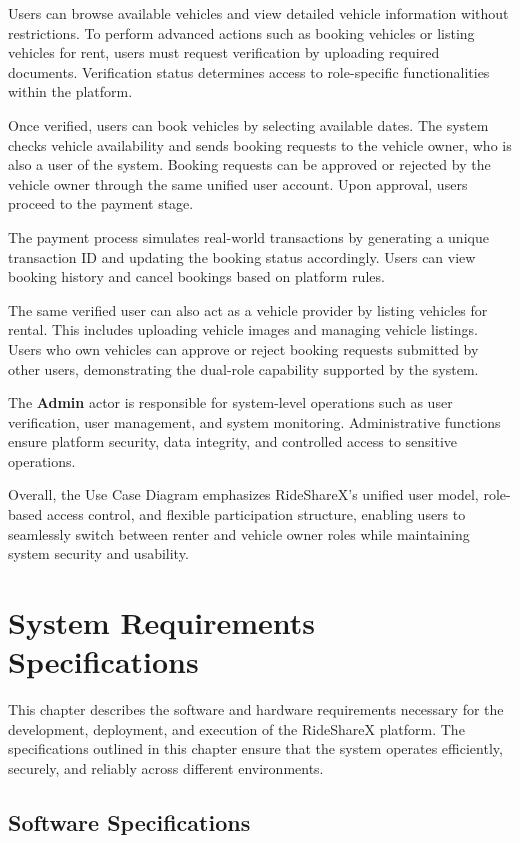 \documentclass[12pt,a4paper]{report}
\begin{document}
Users can browse available vehicles and view detailed vehicle information without restrictions. To perform advanced actions such as booking vehicles or listing vehicles for rent, users must request verification by uploading required documents. Verification status determines access to role-specific functionalities within the platform.

Once verified, users can book vehicles by selecting available dates. The system checks vehicle availability and sends booking requests to the vehicle owner, who is also a user of the system. Booking requests can be approved or rejected by the vehicle owner through the same unified user account. Upon approval, users proceed to the payment stage.

The payment process simulates real-world transactions by generating a unique transaction ID and updating the booking status accordingly. Users can view booking history and cancel bookings based on platform rules.

The same verified user can also act as a vehicle provider by listing vehicles for rental. This includes uploading vehicle images and managing vehicle listings. Users who own vehicles can approve or reject booking requests submitted by other users, demonstrating the dual-role capability supported by the system.

The \textbf{Admin} actor is responsible for system-level operations such as user verification, user management, and system monitoring. Administrative functions ensure platform security, data integrity, and controlled access to sensitive operations.

Overall, the Use Case Diagram emphasizes RideShareX’s unified user model, role-based access control, and flexible participation structure, enabling users to seamlessly switch between renter and vehicle owner roles while maintaining system security and usability.

\chapter{System Requirements Specifications}

This chapter describes the software and hardware requirements necessary for the development, deployment, and execution of the RideShareX platform. The specifications outlined in this chapter ensure that the system operates efficiently, securely, and reliably across different environments.

\section{Software Specifications}
\end{document}
